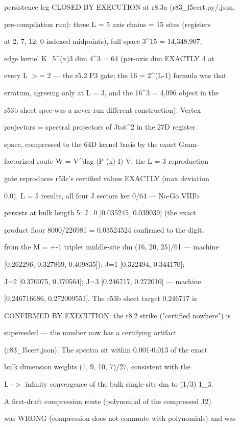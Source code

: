 \documentclass[11pt,a4paper]{article}
\theoremstyle{definition}
\begin{document}
persistence leg CLOSED BY EXECUTION at r8.3a (r83\_l5cert.py/.json,

pre-compilation run): three L = 5 axis chains = 15 sites (registers

at 2, 7, 12; 0-indexed midpoints), full space 3\^{}15 = 14,348,907,

edge kernel K\_5\^{}{(x)3} dim 4\^{}3 = 64 (per-axis dim EXACTLY 4 at

every L $>$= 2 — the r5.2 P3 gate; the 16 = 2\^{}(L-1) formula was that

erratum, agreeing only at L = 3, and the 16\^{}3 = 4,096 object in the

r53b sheet spec was a never-run different construction). Vertex

projectors = spectral projectors of Jtot\^{}2 in the 27D register

space, compressed to the 64D kernel basis by the exact Gram-

factorized route W = V\^{}dag (P (x) I) V; the L = 3 reproduction

gate reproduces r53c's certified values EXACTLY (max deviation

0.0). L = 5 results, all four J sectors ker 0/64 — No-Go VIIIb

persists at bulk length 5: J=0 [0.035245, 0.039039] (the exact

product floor 8000/226981 = 0.03524524 confirmed to the digit,

from the M = +-1 triplet middle-site dm (16, 20, 25)/61 — machine

[0.262296, 0.327869, 0.409835]); J=1 [0.322494, 0.344170];

J=2 [0.370075, 0.370564]; J=3 [0.246717, 0.272010] — machine

[0.246716686, 0.272009551]. The r53b sheet target 0.246717 is

CONFIRMED BY EXECUTION: the r8.2 strike ("certified nowhere") is

superseded — the number now has a certifying artifact

(r83\_l5cert.json). The spectra sit within 0.001-0.013 of the exact

bulk dimension weights (1, 9, 10, 7)/27, consistent with the

L -$>$ infinity convergence of the bulk single-site dm to (1/3) 1\_3.

A first-draft compression route (polynomial of the compressed J2)

was WRONG (compression does not commute with polynomials) and was
\end{document}
